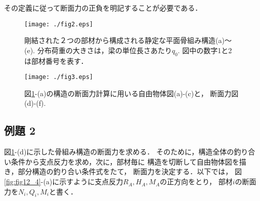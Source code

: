 \documentclass[10pt,a4j]{jarticle}
\begin{document}
その定義に従って断面力の正負を明記することが必要である．
\begin{figure}[h]
	\begin{center}
	\texttt{[image: ./fig2.eps]} 
	\end{center}
	\caption{
		剛結された２つの部材から構成される静定な平面骨組み構造(a)〜(e). 
		分布荷重の大きさは，梁の単位長さあたり$q_0$. 図中の数字1と2は部材番号を表す．
	} 
	\label{fig:fig12_2}
\end{figure}
\begin{figure}[h]
	\begin{center}
	\texttt{[image: ./fig3.eps]} 
	\end{center}
	\caption{
		図\ref{fig:fig12_2}-(a)の構造の断面力計算に用いる自由物体図(a)-(c)と，
		断面力図(d)-(f).
	} 
	\label{fig:fig12_3}
\end{figure}
\subsection{例題 2}
図\ref{fig:fig12_2}-(d)に示した骨組み構造の断面力を求める．
そのために，構造全体の釣り合い条件から支点反力を求め，次に，部材毎に
構造を切断して自由物体図を描き，部分構造の釣り合い条件式をたて，
断面力を決定する．以下では，
図\ref{fig:fig12_4}-(a)に示すように支点反力$R_A,H_A,M_A$の正方向をとり，
部材$i$の断面力を$N_i, Q_i, M_i$と書く．
\end{document}
